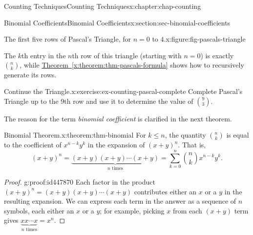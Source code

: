 \documentclass[oneside,10pt,]{book}
\newcommand{\xreffont}{\relax}
\numberwithin{equation}{section}
\begin{document}
\begin{chapterptx}{Counting Techniques}{}{Counting Techniques}{}{}{x:chapter:chap-counting}
\begin{sectionptx}{Binomial Coefficients}{}{Binomial Coefficients}{}{}{x:section:sec-binomial-coefficients}
\begin{figureptx}{The first five rows of Pascal's Triangle, for \(n = 0\) to \(4\).}{x:figure:fig-pascals-triangle}{}
\begin{image}{0.3}{0.4}{0.3}
{
}%
\end{image}%
\tcblower
\end{figureptx}%
The \(k\)th entry in the \(n\)th row of this triangle (starting with \(n=0\)) is exactly \(\displaystyle\binom{n}{k}\), while \hyperref[x:theorem:thm-pascals-formula]{Theorem~{\xreffont\ref{x:theorem:thm-pascals-formula}}} shows how to recursively generate its rows.%
\begin{inlineexercise}{Continue the Triangle.}{x:exercise:ex-counting-pascal-complete}%
Complete Pascal's Triangle up to the 9th row and use it to determine the value of \(\displaystyle\binom{9}{3}\).%
\end{inlineexercise}
The reason for the term \emph{binomial coefficient} is clarified in the next theorem.%
\begin{theorem}{Binomial Theorem.}{}{x:theorem:thm-binomial}%
For \(k \leq n\), the quantity \(\displaystyle\binom{n}{k}\) is equal to the coefficient of \(x^{n-k}y^k\) in the expansion of \((x+y)^n\). That is,%
\begin{equation*}
(x+y)^n = \underbrace{(x+y)(x+y)\cdots(x+y)}_\text{$n$ times} = \displaystyle\sum_{k=0}^n \binom{n}{k}x^{n-k}y^k\text{.}
\end{equation*}
%
\end{theorem}
\begin{proof}{}{g:proof:id447870}
Each factor in the product \((x+y)^n = (x+y)(x+y)\cdots(x+y)\) contributes either an \(x\) or a \(y\) in the resulting expansion. We can express each term in the answer as a sequence of \(n\) symbols, each either an \(x\) or a \(y\); for example, picking \(x\) from each \((x+y)\) term gives \(\underbrace{xx\cdots x}_\text{$n$ times}=x^n\).%

\end{proof}
\end{sectionptx}
\end{chapterptx}
\end{document}
